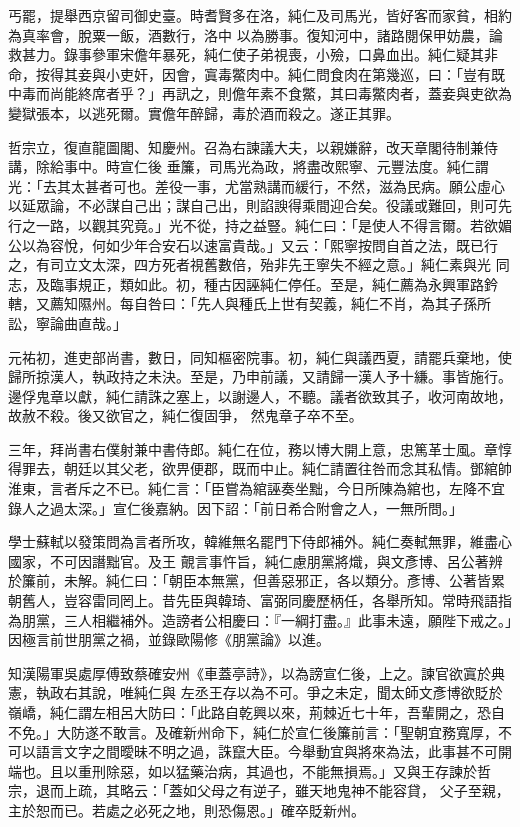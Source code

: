 \begin{pinyinscope}
 丐罷，提舉西京留司御史臺。時耆賢多在洛，純仁及司馬光，皆好客而家貧，相約為真率會，脫粟一飯，酒數行，洛中
 以為勝事。復知河中，諸路閱保甲妨農，論救甚力。錄事參軍宋儋年暴死，純仁使子弟視喪，小殮，口鼻血出。純仁疑其非命，按得其妾與小吏奸，因會，寘毒鱉肉中。純仁問食肉在第幾巡，曰：「豈有既中毒而尚能終席者乎？」再訊之，則儋年素不食鱉，其曰毒鱉肉者，蓋妾與吏欲為變獄張本，以逃死爾。實儋年醉歸，毒於酒而殺之。遂正其罪。



 哲宗立，復直龍圖閣、知慶州。召為右諫議大夫，以親嫌辭，改天章閣待制兼侍講，除給事中。時宣仁後
 垂簾，司馬光為政，將盡改熙寧、元豐法度。純仁謂光：「去其太甚者可也。差役一事，尤當熟講而緩行，不然，滋為民病。願公虛心以延眾論，不必謀自己出；謀自己出，則諂諛得乘間迎合矣。役議或難回，則可先行之一路，以觀其究竟。」光不從，持之益豎。純仁曰：「是使人不得言爾。若欲媚公以為容悅，何如少年合安石以速富貴哉。」又云：「熙寧按問自首之法，既已行之，有司立文太深，四方死者視舊數倍，殆非先王寧失不經之意。」純仁素與光
 同志，及臨事規正，類如此。初，種古因誣純仁停任。至是，純仁薦為永興軍路鈐轄，又薦知隰州。每自咎曰：「先人與種氏上世有契義，純仁不肖，為其子孫所訟，寧論曲直哉。」



 元祐初，進吏部尚書，數日，同知樞密院事。初，純仁與議西夏，請罷兵棄地，使歸所掠漢人，執政持之未決。至是，乃申前議，又請歸一漢人予十縑。事皆施行。邊俘鬼章以獻，純仁請誅之塞上，以謝邊人，不聽。議者欲致其子，收河南故地，故赦不殺。後又欲官之，純仁復固爭，
 然鬼章子卒不至。



 三年，拜尚書右僕射兼中書侍郎。純仁在位，務以博大開上意，忠篤革士風。章惇得罪去，朝廷以其父老，欲畀便郡，既而中止。純仁請置往咎而念其私情。鄧綰帥淮東，言者斥之不已。純仁言：「臣嘗為綰誣奏坐黜，今日所陳為綰也，左降不宜錄人之過太深。」宣仁後嘉納。因下詔：「前日希合附會之人，一無所問。」



 學士蘇軾以發策問為言者所攻，韓維無名罷門下侍郎補外。純仁奏軾無罪，維盡心國家，不可因譖黜官。及王
 覿言事忤旨，純仁慮朋黨將熾，與文彥博、呂公著辨於簾前，未解。純仁曰：「朝臣本無黨，但善惡邪正，各以類分。彥博、公著皆累朝舊人，豈容雷同罔上。昔先臣與韓琦、富弼同慶歷柄任，各舉所知。常時飛語指為朋黨，三人相繼補外。造謗者公相慶曰：『一綱打盡。』此事未遠，願陛下戒之。」因極言前世朋黨之禍，並錄歐陽修《朋黨論》以進。



 知漢陽軍吳處厚傅致蔡確安州《車蓋亭詩》，以為謗宣仁後，上之。諫官欲寘於典憲，執政右其說，唯純仁與
 左丞王存以為不可。爭之未定，聞太師文彥博欲貶於嶺嶠，純仁謂左相呂大防曰：「此路自乾興以來，荊棘近七十年，吾輩開之，恐自不免。」大防遂不敢言。及確新州命下，純仁於宣仁後簾前言：「聖朝宜務寬厚，不可以語言文字之間曖昧不明之過，誅竄大臣。今舉動宜與將來為法，此事甚不可開端也。且以重刑除惡，如以猛藥治病，其過也，不能無損焉。」又與王存諫於哲宗，退而上疏，其略云：「蓋如父母之有逆子，雖天地鬼神不能容貸，
 父子至親，主於恕而已。若處之必死之地，則恐傷恩。」確卒貶新州。




\end{pinyinscope}
